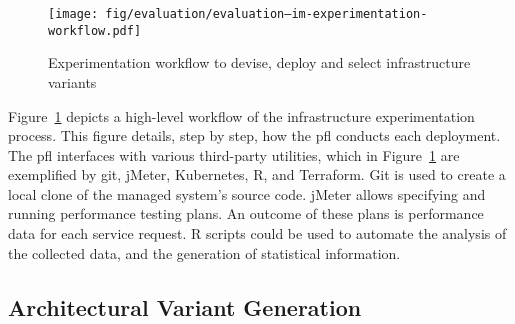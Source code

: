 \begin{figure}[p]
	\centering
	\texttt{[image: fig/evaluation/evaluation--im-experimentation-workflow.pdf]}
	\caption{Experimentation workflow to devise, deploy and select infrastructure variants}
	\label{fig:evaluation--im-experimentation-workflow}
\end{figure}

Figure~\ref{fig:evaluation--im-experimentation-workflow} depicts a high-level workflow of the infrastructure experimentation process. This figure details, step by step, how the \gls{pfl} conducts each deployment. The \gls{pfl} interfaces with various third-party utilities, which in Figure~\ref{fig:evaluation--im-experimentation-workflow} are exemplified by git, jMeter, Kubernetes, R, and Terraform. Git is used to create a local clone of the managed system's source code. jMeter allows specifying and running performance testing plans. An outcome of these plans is performance data for each service request. R scripts could be used to automate the analysis of the collected data, and the generation of statistical information.

\subsection{Architectural Variant Generation}
\label{subsect:architectural-framework--architectural-variant-generation}


